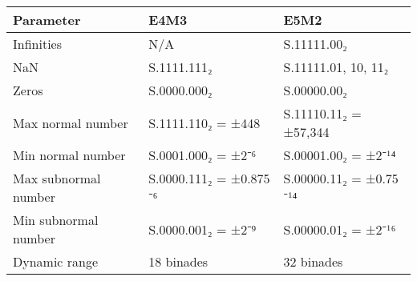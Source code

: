 \renewcommand{\arraystretch}{1.25}
\centering
\begin{tabular}{lll}
Parameter            & E4M3                        & E5M2                        \\
\midrule
Infinities           & N/A                         & S.11111.00₂                 \\
\hline
NaN                  & S.1111.111₂                 & S.11111.{01, 10, 11}₂       \\
\hline
Zeros                & S.0000.000₂                 & S.00000.00₂                 \\
\hline
Max normal number    & S.1111.110₂ = ±448          & S.11110.11₂ = ±57,344       \\
\hline
Min normal number    & S.0001.000₂ = ±2⁻⁶          & S.00001.00₂ = ±2⁻¹⁴         \\
\hline
Max subnormal number & S.0000.111₂ = ±0.875 \* 2⁻⁶ & S.00000.11₂ = ±0.75 \* 2⁻¹⁴ \\
\hline
Min subnormal number & S.0000.001₂ = ±2⁻⁹          & S.00000.01₂ = ±2⁻¹⁶         \\
\hline
Dynamic range        & 18 binades                  & 32 binades                  \\
\end{tabular}
